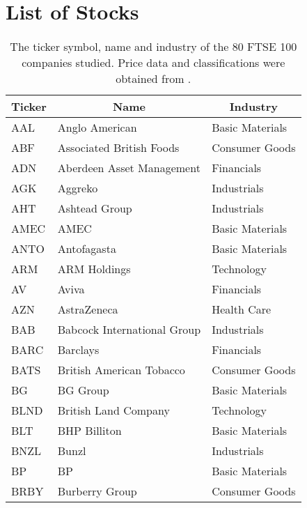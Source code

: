 
\chapter{List of Stocks}

\label{app:listFTSE100Stocks}

\begin{center}
\begin{longtable}{|l|l|l|}
	\caption[List of FTSE 100 Stocks studied]{The ticker symbol, name and industry of the 80 FTSE 100 companies studied. Price data and classifications were obtained from \cite{IcWik,LSE,YahFi}.}
	\label{tab:listFTSE100Stocks} \\
	\hline \multicolumn{1}{|c|}{\textbf{Ticker}} & \multicolumn{1}{c|}{\textbf{Name}} & \multicolumn{1}{c|}{\textbf{Industry}} \\ \hline 
	\endfirsthead
	\hline \hline
	\endlastfoot
    AAL   & Anglo American & Basic Materials \\
    ABF   & Associated British Foods & Consumer Goods \\
    ADN   & Aberdeen Asset Management & Financials \\
    AGK   & Aggreko & Industrials \\
    AHT   & Ashtead Group & Industrials \\
    AMEC  & AMEC  & Basic Materials \\
    ANTO  & Antofagasta & Basic Materials \\
    ARM   & ARM Holdings & Technology \\
    AV    & Aviva & Financials \\
    AZN   & AstraZeneca & Health Care \\
    BAB   & Babcock International Group & Industrials \\
    BARC  & Barclays & Financials \\
    BATS  & British American Tobacco & Consumer Goods \\
    BG    & BG Group & Basic Materials \\
    BLND  & British Land Company & Technology \\
    BLT   & BHP Billiton & Basic Materials \\
    BNZL  & Bunzl & Industrials \\
    BP    & BP    & Basic Materials \\
    BRBY  & Burberry Group & Consumer Goods \\

\end{longtable}
\end{center}
